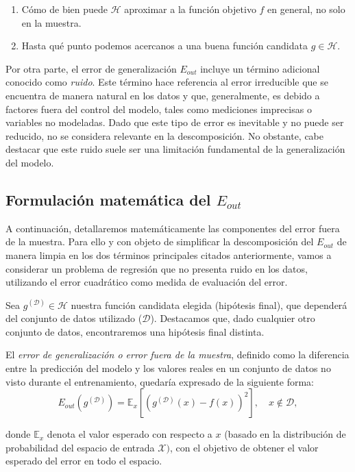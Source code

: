 \begin{enumerate}
    \item Cómo de bien puede $\mathcal{H}$ aproximar a la función objetivo $f$ en general, no solo en la muestra.
    \item Hasta qué punto podemos acercanos a una buena función candidata $g \in \mathcal{H}$.
\end{enumerate}

Por otra parte, el error de generalización $E_{out}$ incluye un término adicional conocido como \textit{ruido}. Este término hace referencia al error irreducible que se encuentra de manera natural en los datos y que, generalmente, es debido a factores fuera del control del modelo, tales como mediciones imprecisas o variables no modeladas. Dado que este tipo de error es inevitable y no puede ser reducido, no se considera relevante en la descomposición. No obstante, cabe destacar que este ruido suele ser una limitación fundamental de la generalización del modelo.

\subsection{Formulación matemática del $E_{out}$}\label{sec:formulacion-matematica-Eout}
A continuación, detallaremos matemáticamente las componentes del error fuera de la muestra. Para ello y con objeto de simplificar la descomposición del $E_{out}$ de manera limpia en los dos términos principales citados anteriormente, vamos a considerar un problema de regresión que no presenta ruido en los datos, utilizando el error cuadrático como medida de evaluación del error.

Sea $g^{\mathcal{(D)}} \in \mathcal{H}$ nuestra función candidata elegida (hipótesis final), que dependerá del conjunto de datos utilizado ($\mathcal{D}$). Destacamos que, dado cualquier otro conjunto de datos, encontraremos una hipótesis final distinta.

El \emph{error de generalización o error fuera de la muestra}, definido como la diferencia entre la predicción del modelo y los valores reales en un conjunto de datos no visto durante el entrenamiento, quedaría expresado de la siguiente forma:
\begin{equation}\label{eq:E_out1}
    E_{out}(g^{\mathcal{(D)}}) = \mathbb{E}_{x}[{(g^{\mathcal{(D)}}(x) - f(x))}^2], \quad x \notin \mathcal{D},
\end{equation}

donde $\mathbb{E}_{x}$ denota el valor esperado con respecto a $x$ (basado en la distribución de probabilidad del espacio de entrada $\mathcal{X})$, con el objetivo de obtener el valor esperado del error en todo el espacio.

